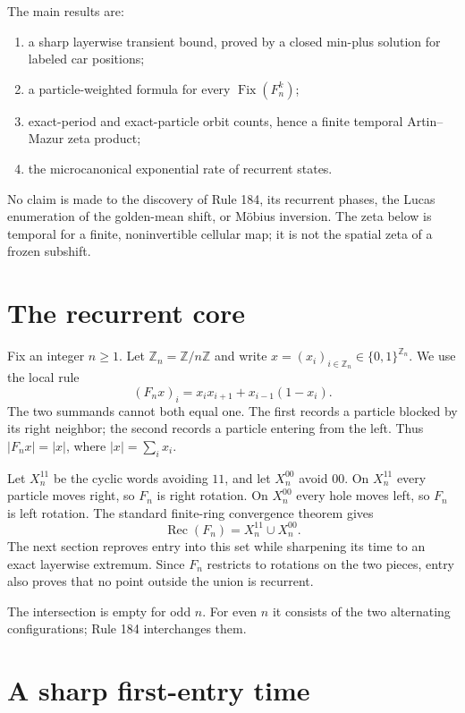 \documentclass[11pt,a4paper]{amsart}
\theoremstyle{definition}
\theoremstyle{remark}
\newcommand{\Fix}{\operatorname{Fix}}
\newcommand{\Rec}{\operatorname{Rec}}
\newcommand{\Z}{\mathbb Z}
\newcommand{\1}{\mathbf 1}
\begin{document}
The main results are:
\begin{enumerate}
\item a sharp layerwise transient bound, proved by a closed min-plus solution
for labeled car positions;
\item a particle-weighted formula for every $\Fix(F_n^k)$;
\item exact-period and exact-particle orbit counts, hence a finite temporal
Artin--Mazur zeta product;
\item the microcanonical exponential rate of recurrent states.
\end{enumerate}
No claim is made to the discovery of Rule 184, its recurrent phases, the
Lucas enumeration of the golden-mean shift, or M\"obius inversion.  The zeta
below is temporal for a finite, noninvertible cellular map; it is not the
spatial zeta of a frozen subshift.

\section{The recurrent core}

Fix an integer $n\geq1$.  Let $\Z_n=\Z/n\Z$ and write
$x=(x_i)_{i\in\Z_n}\in\{0,1\}^{\Z_n}$.  We use the local rule
\begin{equation}\label{eq:rule}
 (F_nx)_i=x_ix_{i+1}+x_{i-1}(1-x_i).
\end{equation}
The two summands cannot both equal one.  The first records a particle blocked
by its right neighbor; the second records a particle entering from the left.
Thus $|F_nx|=|x|$, where $|x|=\sum_i x_i$.

Let $X_n^{11}$ be the cyclic words avoiding $11$, and let $X_n^{00}$ avoid
$00$.  On $X_n^{11}$ every particle moves right, so $F_n$ is right rotation.
On $X_n^{00}$ every hole moves left, so $F_n$ is left rotation.  The standard
finite-ring convergence theorem gives
\begin{equation}\label{eq:core}
 \Rec(F_n)=X_n^{11}\cup X_n^{00}.
\end{equation}
The next section reproves entry into this set while sharpening its time to an
exact layerwise extremum.  Since $F_n$ restricts to rotations on the two
pieces, entry also proves that no point outside the union is recurrent.

The intersection is empty for odd $n$.  For even $n$ it consists of the two
alternating configurations; Rule 184 interchanges them.

\section{A sharp first-entry time}
\end{document}
